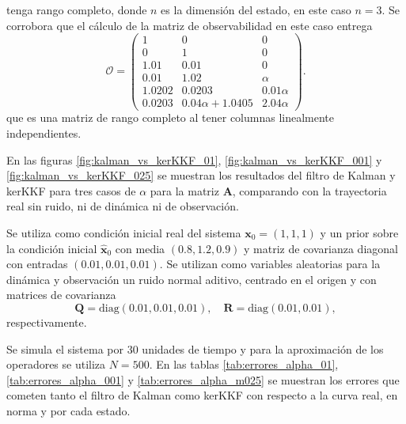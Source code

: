 tenga rango completo, donde $n$ es la dimensión del estado, en este caso $n=3$. Se corrobora que el cálculo de la matriz de observabilidad en este caso entrega
\[
\mathcal{O} =
\begin{pmatrix}
1 & 0 & 0 \\
0 & 1 & 0 \\
1.01 & 0.01 & 0 \\
0.01 & 1.02 & \alpha \\
1.0202 & 0.0203 & 0.01\alpha \\
0.0203 & 0.04\alpha + 1.0405 & 2.04\alpha
\end{pmatrix}.
\]
que es una matriz de rango completo al tener columnas linealmente independientes.

En las figuras \ref{fig:kalman_vs_kerKKF_01}, \ref{fig:kalman_vs_kerKKF_001} y \ref{fig:kalman_vs_kerKKF_025} se muestran los resultados del filtro de Kalman y kerKKF para tres casos de $\alpha$ para la matriz $\mathbf{A}$, comparando con la trayectoria real sin ruido, ni de dinámica ni de observación.

Se utiliza como condición inicial real del sistema $\mathbf{x}_0 = (1,1,1)$ y un prior sobre la condición inicial $\hat{\mathbf{x}}_0$ con media $(0.8, 1.2, 0.9)$ y matriz de covarianza diagonal con entradas $(0.01, 0.01, 0.01)$. Se utilizan como variables aleatorias para la dinámica y observación un ruido normal aditivo, centrado en el origen y con matrices de covarianza
\begin{equation*}
    \mathbf{Q} = \text{diag}(0.01, 0.01, 0.01), \quad \mathbf{R} = \text{diag}(0.01, 0.01),
\end{equation*}
respectivamente.

Se simula el sistema por $30$ unidades de tiempo y para la aproximación de los operadores se utiliza $N=500$. En las tablas \ref{tab:errores_alpha_01}, \ref{tab:errores_alpha_001} y \ref{tab:errores_alpha_m025} se muestran los errores que cometen tanto el filtro de Kalman como kerKKF con respecto a la curva real, en norma y por cada estado.



